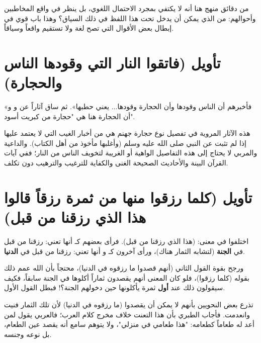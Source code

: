 \begin{fawaid}
من دقائق منهج  هنا أنه لا يكتفي بمجرد الاحتمال اللغوي، بل ينظر في واقع المخاطبين وأحوالهم: من الذي يمكن أن يدخل تحت هذا اللفظ في ذلك السياق؟ وهذا باب قوي في إبطال بعض الأقوال التي تصح لغة ولا تستقيم واقعاً وسياقاً.
\end{fawaid}

\separator

\section{تأويل (فاتقوا النار التي وقودها الناس والحجارة)}
 «فأخبرهم أن الناس وقودها وأن الحجارة وقودها... يعني حطبها».
ثم ساق آثاراً عن  و و أن الحجارة هنا هي "حجارة من كبريت أسود".

\begin{fawaid}
هذه الآثار المروية في تفصيل نوع حجارة جهنم هي من أخبار الغيب التي لا يعتمد عليها إذا لم تثبت عن النبي صلى الله عليه وسلم (وأغلبها مأخوذ من أهل الكتاب). والداعية والمربي لا يحتاج إلى هذه التفاصيل الواهية أو الغريبة لتخويف الناس من النار؛ ففي آيات القرآن البينة والأحاديث الصحيحة الغنى والكفاية للترغيب والترهيب دون تكلف.
\end{fawaid}

\separator

\section{تأويل (كلما رزقوا منها من ثمرة رزقاً قالوا هذا الذي رزقنا من قبل)}
اختلفوا في معنى: (هذا الذي رزقنا من قبل). 
فرأى بعضهم كـ  أنها تعني: رزقنا من قبل في \textbf{الجنة} (لتشابه الثمار هناك)، ورأى آخرون كـ  و أنها تعني: رزقنا من قبل في \textbf{الدنيا}.

ورجح  بقوة القول الثاني (أنهم قصدوا ما رزقوه في الدنيا)، محتجاً بأن الله عمم ذلك بقوله (كلما رزقوا)، فلو كان المعنى أنهم يقصدون ثماراً أكلوها في الجنة سابقاً، فكيف سيقولون ذلك عند \textbf{أول} ثمرة يأكلونها حين دخولهم الجنة؟! فبطل القول الأول.

\begin{fawaid}
تذرع بعض النحويين بأنهم لا يمكن أن يقصدوا (ما رزقوه في الدنيا) لأن تلك الثمار فنيت وانعدمت. فأجاب الطبري بأن هذا التعنت خلاف مخرج كلام العرب؛ فالعربي يقول لمن أعد له طعاماً كطعامه: "هذا طعامي في منزلي"، ولا يتوهم سامع أنه يقصد عين الطعام، بل نوعه وجنسه.
\end{fawaid}

